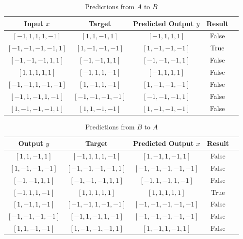 \documentclass[12pt]{article}
\begin{document}
\begin{table}[ht]
    \centering
    \caption{Predictions from \( A \) to \( B \)}
    \begin{tabular}{|c|c|c|c|c|}
        \hline
        \textbf{Input \( x \)} & \textbf{Target} & \textbf{Predicted Output \( y \)} & \textbf{Result} \\ \hline
        $[-1, 1, 1, 1, -1]$ & $[1, 1, -1, 1]$ & $[-1, 1, 1, 1]$ & False \\ \hline
        $[-1, -1, -1, -1, 1]$ & $[1, -1, -1, -1]$ & $[1, -1, -1, -1]$ & True \\ \hline
        $[-1, -1, -1, 1, 1]$ & $[-1, -1, 1, 1]$ & $[-1, -1, -1, 1]$ & False \\ \hline
        $[1, 1, 1, 1, 1]$ & $[-1, 1, 1, -1]$ & $[-1, 1, 1, 1]$ & False \\ \hline
        $[-1, -1, 1, -1, -1]$ & $[1, -1, 1, -1]$ & $[1, -1, -1, -1]$ & False \\ \hline
        $[-1, 1, -1, 1, -1]$ & $[-1, -1, -1, -1]$ & $[-1, -1, -1, 1]$ & False \\ \hline
        $[1, -1, -1, -1, 1]$ & $[1, 1, -1, -1]$ & $[1, -1, -1, -1]$ & False \\ \hline
    \end{tabular}
\end{table}

\begin{table}[ht]
    \centering
    \caption{Predictions from \( B \) to \( A \)}
    \begin{tabular}{|c|c|c|c|c|}
        \hline
        \textbf{Output \( y \)} & \textbf{Target} & \textbf{Predicted Output \( x \)} & \textbf{Result} \\ \hline
        $[1, 1, -1, 1]$ & $[-1, 1, 1, 1, -1]$ & $[1, -1, 1, -1, 1]$ & False \\ \hline
        $[1, -1, -1, -1]$ & $[-1, -1, -1, -1, 1]$ & $[-1, -1, -1, -1, -1]$ & False \\ \hline
        $[-1, -1, 1, 1]$ & $[-1, -1, -1, 1, 1]$ & $[-1, 1, -1, 1, -1]$ & False \\ \hline
        $[-1, 1, 1, -1]$ & $[1, 1, 1, 1, 1]$ & $[1, 1, 1, 1, 1]$ & True \\ \hline
        $[1, -1, 1, -1]$ & $[-1, -1, 1, -1, -1]$ & $[-1, -1, -1, -1, -1]$ & False \\ \hline
        $[-1, -1, -1, -1]$ & $[-1, 1, -1, 1, -1]$ & $[-1, -1, -1, -1, -1]$ & False \\ \hline
        $[1, 1, -1, -1]$ & $[1, -1, -1, -1, 1]$ & $[1, -1, 1, -1, 1]$ & False \\ \hline
    \end{tabular}
\end{table}
\end{document}
